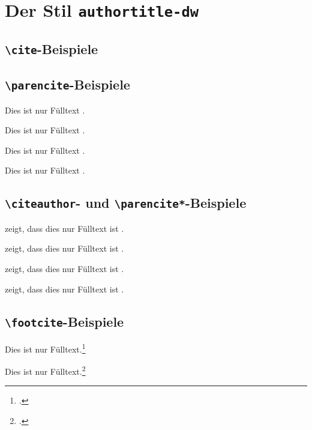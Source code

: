 \documentclass[a4paper]{article}
\newcommand{\cmd}[1]{\texttt{\textbackslash #1}}
\begin{document}
\section*{Der Stil \texttt{authortitle-dw}}

\subsection*{\cmd{cite}-Beispiele}
  
\cite{aristotle:rhetoric}

\cite[59]{aristotle:rhetoric}

\cite[Siehe][]{springer}

\cite[Siehe][92--95]{springer}

\subsection*{\cmd{parencite}-Beispiele}

Dies ist nur Fülltext \parencite{aristotle:rhetoric}.

Dies ist nur Fülltext \parencite[59]{aristotle:rhetoric}.

Dies ist nur Fülltext \parencite[Siehe][]{springer}.

Dies ist nur Fülltext \parencite[Siehe][92--95]{springer}.

\subsection*{\cmd{citeauthor}- und \cmd{parencite*}-Beispiele}

\citeauthor{aristotle:rhetoric} zeigt, dass dies nur Fülltext
ist \parencite*{aristotle:rhetoric}.

\citeauthor{aristotle:rhetoric} zeigt, dass dies nur Fülltext
ist \parencite*[59]{aristotle:rhetoric}.

\citeauthor{springer} zeigt, dass dies nur Fülltext
ist \parencite*[Siehe][]{springer}.

\citeauthor{springer} zeigt, dass dies nur Fülltext
ist \parencite*[Siehe][92--95]{springer}.

\subsection*{\cmd{footcite}-Beispiele}

Dies ist nur Fülltext.\footcite{aristotle:rhetoric}

Dies ist nur Fülltext.\footcite[59]{aristotle:rhetoric}
\end{document}

